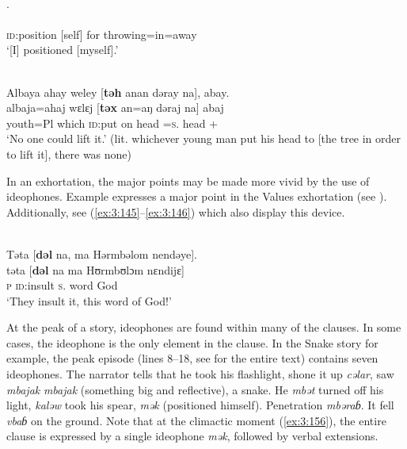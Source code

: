 \ea \label{ex:3:153}\\.\\
\gll  [\textbf{mək}=ava=alaj]\\
      {\textsc{id}:position [self] for throwing}=in=away \\
\glt  ‘[I] positioned [myself].’
\z

\ea \label{ex:3:154}\\
 Albaya ahay weley [\textbf{təh} anan dəray na], abay.\\
\gll      albaja=ahaj   wɛlɛj [\textbf{təx} an=aŋ dəraj   na]  abaj\\
      youth=Pl    which   {\textsc{id}:put on head}   {\DAT}=\textsc{s}.{\IO}   head   {\PSP}   {{\EXT}+{\NEG}}\\
\glt  ‘No one could lift it.’ (lit. whichever young man put his head to [the tree in order to lift it], there was none) 
\z

In an exhortation, the major points may be made more vivid by the use of ideophones. Example  expresses a major point in the Values exhortation (see ). Additionally, see (\ref{ex:3:145}--\ref{ex:3:146}) which also display this device.


\ea \label{ex:3:155}\\
Təta  [\textbf{dəl}  na,  ma  Hərmbəlom  nendəye].\\
\gll  təta   [\textbf{dəl}     na   ma   Hʊrmbʊlɔm   nɛndijɛ]\\
      \textsc{p}  \textsc{id}:insult  \textsc{s}.{\DO}  word  God    {\DEM}\\
\glt  ‘They insult it, this word of God!’ 
\z

At the peak of a story, ideophones are found within many of the clauses. In some cases, the ideophone is the only element in the clause. In the Snake story for example, the peak episode (lines 8--18, see  for the entire text) contains seven ideophones. The narrator tells that he took his flashlight, shone it up \textit{cəlar}, saw \textit{mbajak} \textit{mbajak} (something big and reflective), a snake. He \textit{mbət} turned off his light, \textit{kaləw} took his spear, \textit{mək} (positioned himself). Penetration \textit{mbəraɓ}. It fell \textit{vbaɓ} on the ground. Note that at the climactic moment (\ref{ex:3:156}), the entire clause is expressed by a single ideophone \textit{mək}, followed by verbal extensions.


